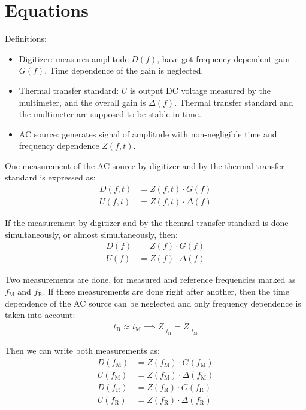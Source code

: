 \section{Equations}
Definitions:
\begin{itemize}
	\item Digitizer: measures amplitude $D(f)$, have got frequency dependent gain $G(f)$. Time dependence of the gain is neglected.
	\item Thermal transfer standard: $U$ is output DC voltage measured by the multimeter, and the overall gain is $\Delta(f)$. Thermal transfer standard and the multimeter are supposed to be stable in time.
	\item AC source: generates signal of amplitude with non-negligible time and frequency dependence $Z(f,t)$.
\end{itemize}

One measurement of the AC source by digitizer and by the thermal transfer
standard is expressed as:
\begin{align}
	D(f, t) & = Z(f, t) \cdot G(f)      \\
	U(f, t) & = Z(f, t) \cdot \Delta(f)
\end{align}

If the measurement by digitizer and by the themral transfer standard is done simultaneously, or almost simultaneously, then:
\begin{align}
	D(f) & = Z(f) \cdot G(f)      \\
	U(f) & = Z(f) \cdot \Delta(f)
\end{align}


Two measurements are done, for measured and reference frequencies marked as
$f_\text{M}$ and $f_\text{R}$. If these measurements are done right after
another, then the time dependence of the AC source can be neglected and only
frequency dependence is taken into account:
\begin{align}
	t_\text{R} \approx t_\text{M} \implies Z\big|_{t_\text{R}} = Z\big|_{t_\text{M}}
\end{align}

Then we can write both measurements as:
\begin{align}
	D(f_\text{M}) & = Z(f_\text{M}) \cdot      G(f_\text{M}) \\
	U(f_\text{M}) & = Z(f_\text{M}) \cdot \Delta(f_\text{M}) \\
	D(f_\text{R}) & = Z(f_\text{R}) \cdot      G(f_\text{R}) \\
	U(f_\text{R}) & = Z(f_\text{R}) \cdot \Delta(f_\text{R})
\end{align}


